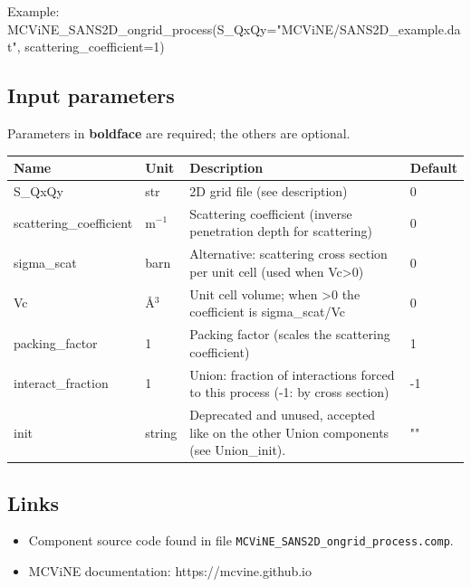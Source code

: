 Example: MCViNE\_SANS2D\_ongrid\_process(S\_QxQy="MCViNE/SANS2D\_example.dat", scattering\_coefficient=1)

\subsection*{Input parameters}
Parameters in \textbf{boldface} are required; the others are optional.

\begin{longtable}{p{}p{}p{}p{}}
\toprule
\textbf{Name} & \textbf{Unit} & \textbf{Description} & \textbf{Default} \\
\midrule
\endhead
S\_QxQy & str & 2D grid file (see description) & 0 \\
scattering\_coefficient & m$^{-1}$ & Scattering coefficient (inverse penetration depth for scattering) & 0 \\
sigma\_scat & barn & Alternative: scattering cross section per unit cell (used when Vc\textgreater{}0) & 0 \\
Vc & \AA{}$^{3}$ & Unit cell volume; when \textgreater{}0 the coefficient is sigma\_scat/Vc & 0 \\
packing\_factor & 1 & Packing factor (scales the scattering coefficient) & 1 \\
interact\_fraction & 1 & Union: fraction of interactions forced to this process (-1: by cross section) & -1 \\
init & string & Deprecated and unused, accepted like on the other Union components (see Union\_init). & "" \\
\bottomrule
\end{longtable}

\subsection*{Links}
\begin{itemize}
  \item Component source code found in file \texttt{MCViNE\_SANS2D\_ongrid\_process.comp}.
  \item MCViNE documentation: https://mcvine.github.io
\end{itemize}
